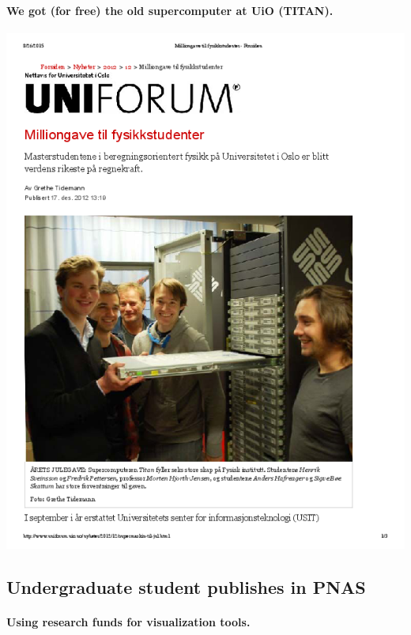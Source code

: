 \documentclass[%
<<<<<<< HEAD
oneside,                 %
final,                   %
=======
twoside,                 %
final,                   %
>>>>>>> 5fc06d357468ca5ec59d2d3ed0179709275f8f00
10pt]{article}
\begin{document}
\begin{itemize}
\paragraph{We got (for free) the old supercomputer at UiO (TITAN).}


\centerline{\includegraphics[width=0.7\linewidth]{fig-future/uniforum-0.png}}




\subsection*{Undergraduate student publishes in PNAS}

\paragraph{Using research funds for visualization tools.}



\end{itemize}
\end{document}

